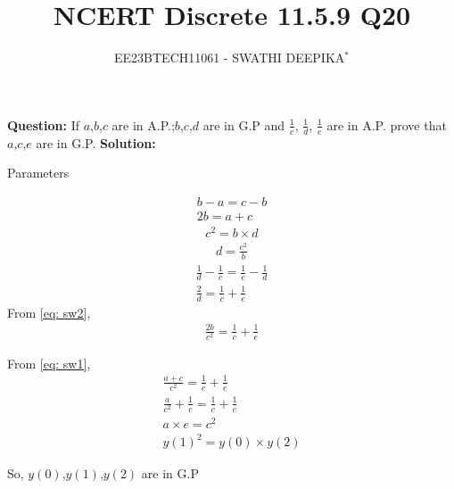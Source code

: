\documentclass[journal,12pt,twocolumn]{IEEEtran}
\title{
	
\title{NCERT Discrete 11.5.9 Q20}
\author{EE23BTECH11061 - SWATHI DEEPIKA$^{*}$%
}


}
\theoremstyle{remark}
\newcommand{\solution}{\noindent \textbf{Solution: }}
\begin{document}
\maketitle

\textbf{Question:} 
If $a$,$b$,$c$ are in A.P.;$b$,$c$,$d$ are in G.P and $\frac{1}{c}$, $\frac{1}{d}$, $\frac{1}{e}$ are in A.P. prove that $a$,$c$,$e$ are in G.P.
\solution
 \begin{table}[h]
 	\centering
 	\resizebox{6 cm}{!}{
 		
 	}
 	\vspace{6 pt}
 	\caption{Parameters}
 	\label{tab:swa_tabel} 
 \end{table}

 
\begin{align}
b-a = c-b\\
2b=a+c \label{eq: sw1}
\end{align}
\begin{align}
c^2 = b\times d
\end{align}
\begin{align}
d= \frac{c^2}{b} \label{eq: sw2}
\end{align}
\begin{align}
\frac{1}{d} - \frac{1}{c} = \frac{1}{e} - \frac{1}{d}\\
\frac{2}{d} = \frac{1}{c} + \frac{1}{e}
\end{align}
From \eqref{eq: sw2},
\begin{align}
\frac{2b}{c^2} = \frac{1}{c} + \frac{1}{e}
\end{align}

From \eqref{eq: sw1},
\begin{align}\frac{a + c}{c^2} = \frac{1}{c} + \frac{1}{e}\\
\frac{a}{c^2} + \frac{1}{c} = \frac{1}{c} + \frac{1}{e}\\
a \times e = {c}^2\\
{y(1)}^2 = y(0) \times y(2)
\end{align}

So, $y(0)$,$y(1)$,$y(2)$ are in G.P\\
\end{document}
